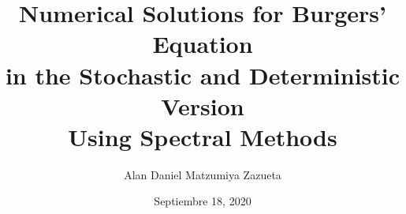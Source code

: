 \documentclass{tesismatpdf}
\date{Septiembre 18, 2020}
\title{Numerical Solutions for Burgers' Equation \\ in the Stochastic and Deterministic Version\\ Using Spectral Methods}
\author{Alan Daniel Matzumiya Zazueta}
\begin{document}
\frontmatter
\maketitle
\cleardoublepage







\tableofcontents
\mainmatter

\thispagestyle{myheadings}






\begin{appendices}
	
\end{appendices}

%

%

\backmatter



\end{document}
